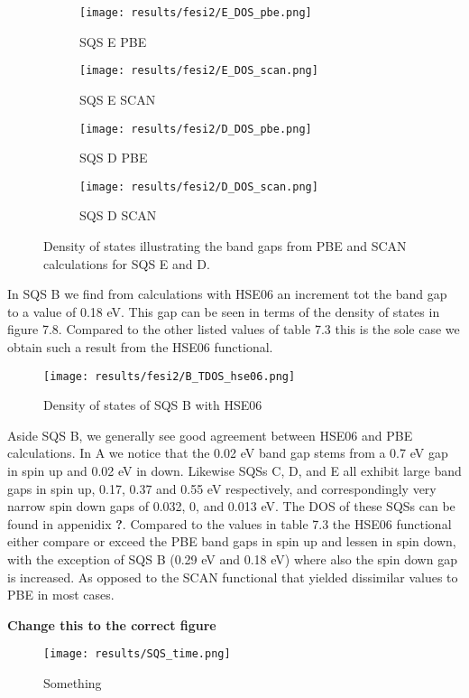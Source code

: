 \begin{figure}[H]
	\begin{subfigure}{.5\textwidth}
		\texttt{[image: results/fesi2/E\_DOS\_pbe.png]}
		\caption{SQS E PBE}
	\end{subfigure}
	\begin{subfigure}{.5\textwidth}
		\texttt{[image: results/fesi2/E\_DOS\_scan.png]}
		\caption{SQS E SCAN}
	\end{subfigure}
	\begin{subfigure}{.5\textwidth}
		\texttt{[image: results/fesi2/D\_DOS\_pbe.png]}
		\caption{SQS D PBE}
	\end{subfigure}
	\begin{subfigure}{.5\textwidth}
		\texttt{[image: results/fesi2/D\_DOS\_scan.png]}
		\caption{SQS D SCAN}
	\end{subfigure}
	\caption{Density of states illustrating the band gaps from PBE and SCAN calculations for SQS E and D.}
\end{figure}


In SQS B we find from calculations with HSE06 an increment tot the band gap to a value of 0.18 eV. This gap can be seen in terms of the density of states in figure 7.8. Compared to the other listed values of table 7.3 this is the sole case we obtain such a result from the HSE06 functional.   

\begin{figure}[H]
	\centering	
	\texttt{[image: results/fesi2/B\_TDOS\_hse06.png]}
	\caption{Density of states of SQS B with HSE06}
\end{figure}


Aside SQS B, we generally see good agreement between HSE06 and PBE calculations. In A we notice that the 0.02 eV band gap stems from a 0.7 eV gap in spin up and 0.02 eV in down. Likewise SQSs C, D, and E all exhibit large band gaps in spin up, 0.17, 0.37 and 0.55 eV respectively, and correspondingly very narrow spin down gaps of 0.032, 0, and 0.013 eV. The DOS of these SQSs can be found in appenidix \textbf{?}. Compared to the values in table 7.3 the HSE06 functional either compare or exceed the PBE band gaps in spin up and lessen in spin down, with the exception of SQS B (0.29 eV and 0.18 eV) where also the spin down gap is increased. As opposed to the SCAN functional that yielded dissimilar values to PBE in most cases.

\textbf{Change this to the correct figure}
\begin{figure}[H]
\centering
\texttt{[image: results/SQS\_time.png]}
\caption{Something}
\end{figure}


